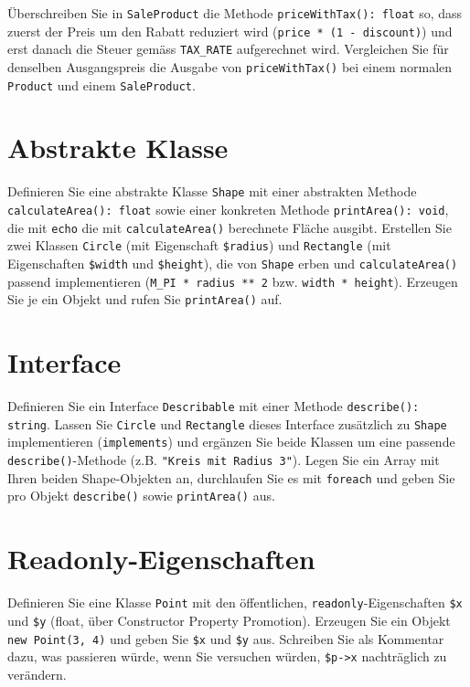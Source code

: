 \documentclass[a4paper,12pt]{article}
\begin{document}
Überschreiben Sie in \texttt{SaleProduct} die Methode \texttt{priceWithTax(): float} so, dass zuerst der Preis um den Rabatt reduziert wird (\texttt{price * (1 - discount)}) und erst danach die Steuer gemäss \texttt{TAX\_RATE} aufgerechnet wird. Vergleichen Sie für denselben Ausgangspreis die Ausgabe von \texttt{priceWithTax()} bei einem normalen \texttt{Product} und einem \texttt{SaleProduct}.

\section{Abstrakte Klasse}

Definieren Sie eine abstrakte Klasse \texttt{Shape} mit einer abstrakten Methode \texttt{calculateArea(): float} sowie einer konkreten Methode \texttt{printArea(): void}, die mit \texttt{echo} die mit \texttt{calculateArea()} berechnete Fläche ausgibt. Erstellen Sie zwei Klassen \texttt{Circle} (mit Eigenschaft \texttt{\$radius}) und \texttt{Rectangle} (mit Eigenschaften \texttt{\$width} und \texttt{\$height}), die von \texttt{Shape} erben und \texttt{calculateArea()} passend implementieren (\texttt{M\_PI * radius ** 2} bzw. \texttt{width * height}). Erzeugen Sie je ein Objekt und rufen Sie \texttt{printArea()} auf.

\section{Interface}

Definieren Sie ein Interface \texttt{Describable} mit einer Methode \texttt{describe(): string}. Lassen Sie \texttt{Circle} und \texttt{Rectangle} dieses Interface zusätzlich zu \texttt{Shape} implementieren (\texttt{implements}) und ergänzen Sie beide Klassen um eine passende \texttt{describe()}-Methode (z.B. \texttt{"Kreis mit Radius 3"}). Legen Sie ein Array mit Ihren beiden Shape-Objekten an, durchlaufen Sie es mit \texttt{foreach} und geben Sie pro Objekt \texttt{describe()} sowie \texttt{printArea()} aus.

\section{Readonly-Eigenschaften}

Definieren Sie eine Klasse \texttt{Point} mit den öffentlichen, \texttt{readonly}-Eigenschaften \texttt{\$x} und \texttt{\$y} (float, über Constructor Property Promotion). Erzeugen Sie ein Objekt \texttt{new Point(3, 4)} und geben Sie \texttt{\$x} und \texttt{\$y} aus. Schreiben Sie als Kommentar dazu, was passieren würde, wenn Sie versuchen würden, \texttt{\$p->x} nachträglich zu verändern.
\end{document}
